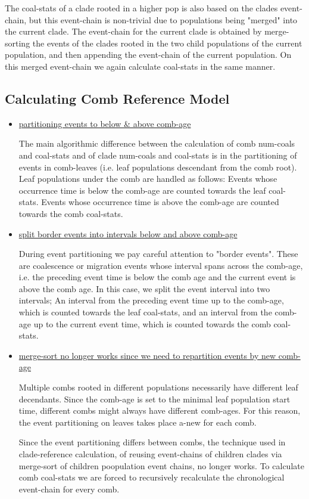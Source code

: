 \documentclass[10pt,a4paper]{article}
\begin{document}
\begin{itemize}
The coal-stats of a clade rooted in a higher pop is also based on the clades event-chain, but this event-chain is non-trivial due to populations being "merged" into the current clade. The event-chain for the current clade is obtained by merge-sorting the events of the clades rooted in the two child populations of the current population, and then appending the event-chain of the current population. On this merged event-chain we again calculate coal-stats in the same manner.



\end{itemize}
\subsection{Calculating Comb Reference Model}
\begin{itemize}

\item \underline{partitioning events to below \& above comb-age}

The main algorithmic difference between the calculation of comb num-coals and coal-stats and of clade num-coals and coal-stats is in the partitioning of events in comb-leaves (i.e. leaf populations descendant from the comb root). Leaf populations under the comb are handled as follows: Events whose occurrence time is below the comb-age are counted towards the leaf coal-stats. Events whose occurrence time is above the comb-age are counted towards the comb coal-stats. 

\item \underline{split border events into intervals below and above comb-age}

During event partitioning we pay careful attention to "border events". These are coalescence or migration events whose interval spans across the comb-age, i.e. the preceding event time is below the comb age and the current event is above the comb age. In this case, we split the event interval into two intervals; An interval from the preceding event time up to the comb-age, which is counted towards the leaf coal-stats, and an interval from the comb-age up to the current event time, which is counted towards the comb coal-stats.

\item \underline{merge-sort no longer works since we need to repartition events by new comb-age}

Multiple combs rooted in different populations necessarily have different leaf decendants. Since the comb-age is set to the minimal leaf population start time, different combs might always have different comb-ages. For this reason, the event partitioning on leaves takes place a-new for each comb.

Since the event partitioning differs between combs, the technique used in clade-reference calculation, of reusing event-chains of children clades via merge-sort of children poopulation event chains, no longer works. To calculate comb coal-stats we are forced to recursively recalculate the chronological event-chain for every comb.

\end{itemize}
\end{document}
